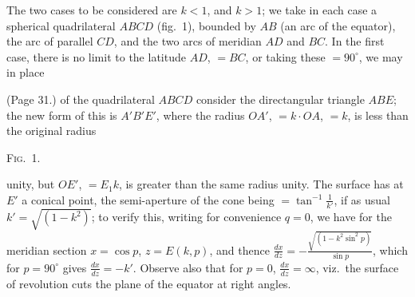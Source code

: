\documentclass[11pt,a4paper]{article}
\begin{document}
The two cases to be considered are $k < 1$, and $k > 1$; we take in each case a spherical quadrilateral $ABCD$ (fig.\ 1), bounded by $AB$ (an arc of the equator), the arc of parallel $CD$, and the two arcs of meridian $AD$ and $BC$. In the first case, there is no limit to the latitude $AD$, $= BC$, or taking these $= 90^\circ$, we may in place

\bigskip

\noindent (Page 31.) of the quadrilateral $ABCD$ consider the directangular triangle $ABE$; the new form of this is $A'B'E'$, where the radius $OA'$, $= k \cdot OA$, $= k$, is less than the original radius

\begin{center}
\textsc{Fig.~1.}\\\relax
{}
\end{center}

\noindent unity, but $OE'$, $= E_1k$, is greater than the same radius unity. The surface has at $E'$ a conical point, the semi-aperture of the cone being $= \tan^{-1} \frac{1}{k'}$, if as usual $k' = \sqrt{(1 - k^2)}$; to verify this, writing for convenience $q = 0$, we have for the meridian section $x = \cos p$, $z = E(k, p)$, and thence $\frac{dx}{dz} = -\frac{\sqrt{(1 - k^2 \sin^2 p)}}{\sin p}$, which for $p = 90^\circ$ gives $\frac{dx}{dz} = -k'$. Observe also that for $p = 0$, $\frac{dx}{dz} = \infty$, viz.\ the surface of revolution cuts the plane of the equator at right angles.
\end{document}
